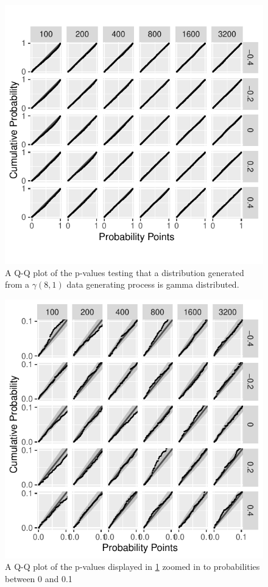 \documentclass[12pt, letterpaper]{article}
\begin{document}
\begin{figure}[tbp]
  \centering
  \includegraphics[scale=1]{figures/gamma}
  \caption{A Q-Q plot of the p-values testing that a distribution
  generated from a $\gamma(8,1)$ data generating process is gamma distributed.}
  \label{fig:gamma}
\end{figure}

\begin{figure}[tbp]
  \centering
  \includegraphics[scale=1]{figures/zoom_gamma}
  \caption{A Q-Q plot of the p-values displayed in \ref{fig:gamma} zoomed in to 
  probabilities between 0 and
  0.1}
  \label{fig:zoom_gamma}
\end{figure}
\end{document}
